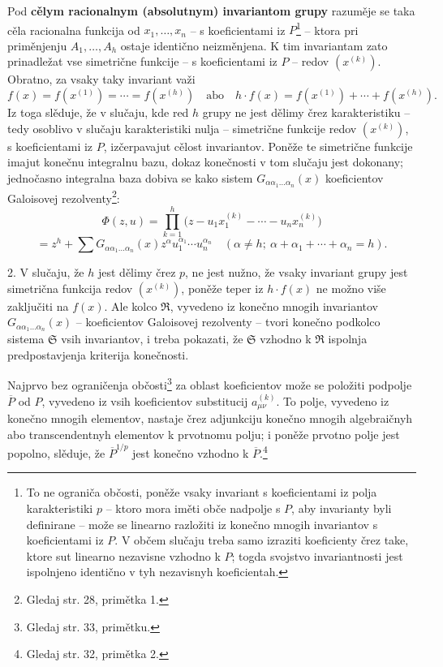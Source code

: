 \documentclass[11pt]{article}
\begin{document}
Pod \textbf{cělym racionalnym (absolutnym) invariantom grupy} razuměje se taka cěla racionalna funkcija od $x_1,\ldots,x_n$ -- s koeficientami iz $P$\footnote{To ne ograniča občosti, poněže vsaky invariant s koeficientami iz polja karakteristiki $p$ -- ktoro mora iměti obče nadpolje s $P$, aby invarianty byli definirane -- može se linearno razložiti iz konečno mnogih invariantov s koeficientami iz $P$. V občem slučaju treba samo izraziti koeficienty črez take, ktore sut linearno nezavisne vzhodno k $P$; togda svojstvo invariantnosti jest ispolnjeno identično v tyh nezavisnyh koeficientah.} -- ktora pri priměnjenju $A_1,\ldots,A_h$ ostaje identično neizměnjena. K tim invariantam zato prinadležat vse simetrične funkcije -- s koeficientami iz $P$ -- redov $(x^{(k)})$. Obratno, za vsaky taky invariant važi
\[
 f(x)=f(x^{(1)})=\cdots=f(x^{(h)})
 \quad\text{abo}\quad
 h\cdot f(x)=f(x^{(1)})+\cdots+f(x^{(h)}).
\]
Iz toga slěduje, že v slučaju, kde red $h$ grupy ne jest dělimy črez karakteristiku -- tedy osoblivo v slučaju karakteristiki nulja -- simetrične funkcije redov $(x^{(k)})$, s koeficientami iz $P$, izčerpavajut cělost invariantov. Poněže te simetrične funkcije imajut konečnu integralnu bazu, dokaz konečnosti v tom slučaju jest dokonany; jednočasno integralna baza dobiva se kako sistem $G_{\alpha\alpha_1\ldots\alpha_n}(x)$ koeficientov Galoisovej rezolventy\footnote{Gledaj str. 28, primětka 1.}:
\[
 \Phi(z,u)=\prod_{k=1}^{h}\bigl(z-u_1x_1^{(k)}-\cdots-u_nx_n^{(k)}\bigr)
\]
\[
 =z^h+\sum G_{\alpha\alpha_1\ldots\alpha_n}(x)
 z^{\alpha}u_1^{\alpha_1}\cdots u_n^{\alpha_n}
 \quad(\alpha\ne h;\ \alpha+\alpha_1+\cdots+\alpha_n=h).
\]

2. V slučaju, že $h$ jest dělimy črez $p$, ne jest nužno, že vsaky invariant grupy jest simetrična funkcija redov $(x^{(k)})$, poněže teper iz $h\cdot f(x)$ ne možno više zaključiti na $f(x)$. Ale kolco $\mathfrak R$, vyvedeno iz konečno mnogih invariantov $G_{\alpha\alpha_1\ldots\alpha_n}(x)$ -- koeficientov Galoisovej rezolventy -- tvori konečno podkolco sistema $\mathfrak S$ vsih invariantov, i treba pokazati, že $\mathfrak S$ vzhodno k $\mathfrak R$ ispolnja predpostavjenja kriterija konečnosti.

Najprvo bez ograničenja občosti\footnote{Gledaj str. 33, primětku.} za oblast koeficientov može se položiti podpolje $\overline P$ od $P$, vyvedeno iz vsih koeficientov substitucij $a_{\mu\nu}^{(k)}$. To polje, vyvedeno iz konečno mnogih elementov, nastaje črez adjunkciju konečno mnogih algebraičnyh abo transcendentnyh elementov k prvotnomu polju; i poněže prvotno polje jest popolno, slěduje, že $\overline P^{1/p}$ jest konečno vzhodno k $\overline P$.\footnote{Gledaj str. 32, primětka 2.}
\end{document}
